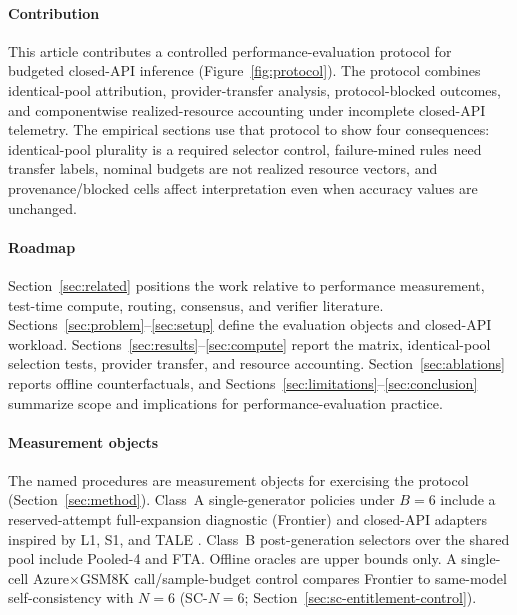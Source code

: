 \paragraph{Contribution}
This article contributes a controlled performance-evaluation protocol for budgeted closed-API
inference (Figure~\ref{fig:protocol}). The protocol combines identical-pool attribution,
provider-transfer analysis, protocol-blocked outcomes, and componentwise realized-resource
accounting under incomplete closed-API telemetry. The empirical sections use that protocol to show
four consequences: identical-pool plurality is a required selector control, failure-mined rules need
transfer labels, nominal budgets are not realized resource vectors, and provenance/blocked cells
affect interpretation even when accuracy values are unchanged.

\paragraph{Roadmap}
Section~\ref{sec:related} positions the work relative to performance measurement, test-time
compute, routing, consensus, and verifier literature. Sections~\ref{sec:problem}--\ref{sec:setup}
define the evaluation objects and closed-API workload. Sections~\ref{sec:results}--\ref{sec:compute}
report the matrix, identical-pool selection tests, provider transfer, and resource accounting.
Section~\ref{sec:ablations} reports offline counterfactuals, and
Sections~\ref{sec:limitations}--\ref{sec:conclusion} summarize scope and implications for
performance-evaluation practice.

\paragraph{Measurement objects}
The named procedures are measurement objects for exercising the protocol
(Section~\ref{sec:method}). Class~A single-generator policies under $B{=}6$ include a
reserved-attempt full-expansion diagnostic (Frontier) and closed-API adapters inspired by L1, S1,
and TALE \citep{l1,s1,tale}. Class~B post-generation selectors over the shared pool include
Pooled-4 and FTA. Offline oracles are upper bounds only. A single-cell Azure$\times$GSM8K
call/sample-budget control compares Frontier to same-model self-consistency with $N{=}6$
(SC-$N{=}6$; Section~\ref{sec:sc-entitlement-control}).
